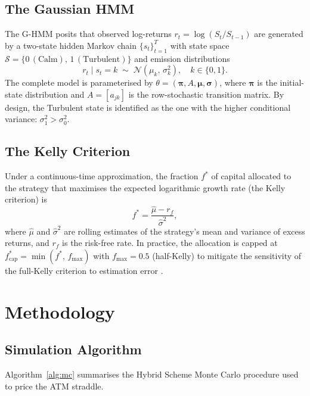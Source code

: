 \documentclass[conference]{IEEEtran}
\newcommand{\N}{\mathcal{N}}
\begin{document}
\subsection{The Gaussian HMM}

The G-HMM posits that observed log-returns $r_t = \log(S_t/S_{t-1})$
are generated by a two-state hidden Markov chain $\{s_t\}_{t=1}^T$
with state space $\mathcal{S} = \{0\,(\text{Calm}),\,
1\,(\text{Turbulent})\}$ and emission distributions
\begin{equation}\label{eq:emission}
  r_t \mid s_t = k \;\sim\; \N(\mu_k,\, \sigma_k^2), \quad k \in \{0,1\}.
\end{equation}
The complete model is parameterised by $\theta = (\bm{\pi}, A,
\bm{\mu}, \bm{\sigma})$, where $\bm{\pi}$ is the initial-state
distribution and $A = [a_{jk}]$ is the row-stochastic transition
matrix.  By design, the Turbulent state is identified as the one with
the higher conditional variance: $\sigma_1^2 > \sigma_0^2$.

\subsection{The Kelly Criterion}

Under a continuous-time approximation, the fraction $f^*$ of capital
allocated to the strategy that maximises the expected logarithmic
growth rate (the Kelly criterion) is
\begin{equation}\label{eq:kelly}
  f^* = \frac{\hat{\mu} - r_f}{\hat{\sigma}^2},
\end{equation}
where $\hat{\mu}$ and $\hat{\sigma}^2$ are rolling estimates of the
strategy's mean and variance of excess returns, and $r_f$ is the
risk-free rate.  In practice, the allocation is capped at
$f^*_{\text{cap}} = \min(f^*,\, f_{\max})$ with $f_{\max} = 0.5$
(half-Kelly) to mitigate the sensitivity of the full-Kelly criterion
to estimation error \cite{thorp2011kelly}.

\section{Methodology}\label{sec:method}

\subsection{Simulation Algorithm}

Algorithm~\ref{alg:mc} summarises the Hybrid Scheme Monte Carlo
procedure used to price the ATM straddle.
\end{document}
